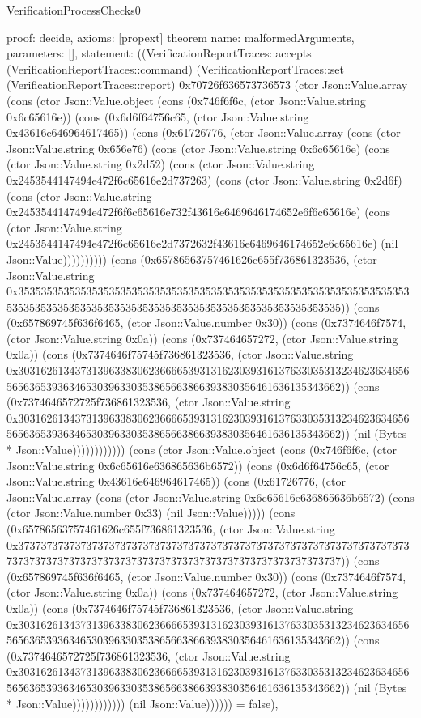 \begin{lexlean}{VerificationProcessChecks0}
\begin{semanticmodule}
{  proof: decide{},
  axioms: [propext]
}
theorem{
  name: malformedArguments,
  parameters: [],
  statement: ((VerificationReportTraces::accepts (VerificationReportTraces::command) (VerificationReportTraces::set (VerificationReportTraces::report) 0x70726f636573736573 (ctor Json::Value.array (cons (ctor Json::Value.object (cons (0x746f6f6c, (ctor Json::Value.string 0x6c65616e)) (cons (0x6d6f64756c65, (ctor Json::Value.string 0x43616e646964617465)) (cons (0x61726776, (ctor Json::Value.array (cons (ctor Json::Value.string 0x656e76) (cons (ctor Json::Value.string 0x6c65616e) (cons (ctor Json::Value.string 0x2d52) (cons (ctor Json::Value.string 0x2453544147494e472f6c65616e2d737263) (cons (ctor Json::Value.string 0x2d6f) (cons (ctor Json::Value.string 0x2453544147494e472f6f6c65616e732f43616e6469646174652e6f6c65616e) (cons (ctor Json::Value.string 0x2453544147494e472f6c65616e2d7372632f43616e6469646174652e6c65616e) (nil Json::Value)))))))))) (cons (0x65786563757461626c655f736861323536, (ctor Json::Value.string 0x35353535353535353535353535353535353535353535353535353535353535353535353535353535353535353535353535353535353535353535353535353535)) (cons (0x657869745f636f6465, (ctor Json::Value.number 0x30)) (cons (0x7374646f7574, (ctor Json::Value.string 0x0a)) (cons (0x737464657272, (ctor Json::Value.string 0x0a)) (cons (0x7374646f75745f736861323536, (ctor Json::Value.string 0x30316261343731396338306236666539313162303931613763303531323462363465656563653936346530396330353865663866393830356461636135343662)) (cons (0x7374646572725f736861323536, (ctor Json::Value.string 0x30316261343731396338306236666539313162303931613763303531323462363465656563653936346530396330353865663866393830356461636135343662)) (nil (Bytes * Json::Value)))))))))))) (cons (ctor Json::Value.object (cons (0x746f6f6c, (ctor Json::Value.string 0x6c65616e636865636b6572)) (cons (0x6d6f64756c65, (ctor Json::Value.string 0x43616e646964617465)) (cons (0x61726776, (ctor Json::Value.array (cons (ctor Json::Value.string 0x6c65616e636865636b6572) (cons (ctor Json::Value.number 0x33) (nil Json::Value))))) (cons (0x65786563757461626c655f736861323536, (ctor Json::Value.string 0x37373737373737373737373737373737373737373737373737373737373737373737373737373737373737373737373737373737373737373737373737373737)) (cons (0x657869745f636f6465, (ctor Json::Value.number 0x30)) (cons (0x7374646f7574, (ctor Json::Value.string 0x0a)) (cons (0x737464657272, (ctor Json::Value.string 0x0a)) (cons (0x7374646f75745f736861323536, (ctor Json::Value.string 0x30316261343731396338306236666539313162303931613763303531323462363465656563653936346530396330353865663866393830356461636135343662)) (cons (0x7374646572725f736861323536, (ctor Json::Value.string 0x30316261343731396338306236666539313162303931613763303531323462363465656563653936346530396330353865663866393830356461636135343662)) (nil (Bytes * Json::Value)))))))))))) (nil Json::Value)))))) = false),
}
\end{semanticmodule}
\end{lexlean}

